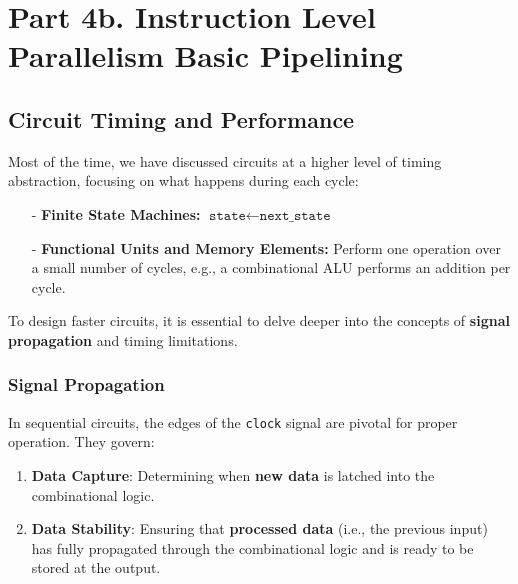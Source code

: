 \chapter{Part 4b. Instruction Level Parallelism Basic Pipelining}
\section{Circuit Timing and Performance}

Most of the time, we have discussed circuits at a higher level of timing abstraction, focusing on what happens during each cycle:
\begin{itemize}
    \item[-] \textbf{Finite State Machines:} $\texttt{state} \gets \texttt{next\_state}$
    \item[-] \textbf{Functional Units and Memory Elements:} Perform one operation over a small number of cycles, e.g., a combinational ALU performs an addition per cycle.
\end{itemize}

To design faster circuits, it is essential to delve deeper into the concepts of \textbf{signal propagation} and timing limitations.
\subsection{Signal Propagation}

In sequential circuits, the edges of the \texttt{clock} signal are pivotal for proper operation. They govern:

\begin{enumerate}
    \item \textbf{Data Capture}: Determining when \textbf{new data} is latched into the combinational logic.
    \item \textbf{Data Stability}: Ensuring that \textbf{processed data} (i.e., the previous input) has fully propagated through the combinational logic and is ready to be stored at the output.
\end{enumerate}

